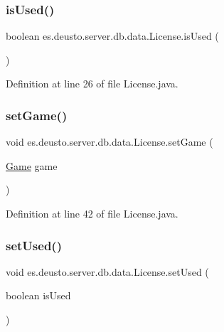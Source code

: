 \subsubsection{\texorpdfstring{is\+Used()}{isUsed()}}
{\footnotesize\ttfamily boolean es.\+deusto.\+server.\+db.\+data.\+License.\+is\+Used (\begin{DoxyParamCaption}{ }\end{DoxyParamCaption})}



Definition at line 26 of file License.\+java.

\mbox{\label{classes_1_1deusto_1_1server_1_1db_1_1data_1_1_license_ab3173591006e39649097242e4a1045cb}} 
\subsubsection{\texorpdfstring{set\+Game()}{setGame()}}
{\footnotesize\ttfamily void es.\+deusto.\+server.\+db.\+data.\+License.\+set\+Game (\begin{DoxyParamCaption}\item[{\hyperlink{classes_1_1deusto_1_1server_1_1db_1_1data_1_1_game}{Game}}]{game }\end{DoxyParamCaption})}



Definition at line 42 of file License.\+java.

\mbox{\label{classes_1_1deusto_1_1server_1_1db_1_1data_1_1_license_aa06731eb1852041fbd788167f6ada563}} 
\subsubsection{\texorpdfstring{set\+Used()}{setUsed()}}
{\footnotesize\ttfamily void es.\+deusto.\+server.\+db.\+data.\+License.\+set\+Used (\begin{DoxyParamCaption}\item[{boolean}]{is\+Used }\end{DoxyParamCaption})}



